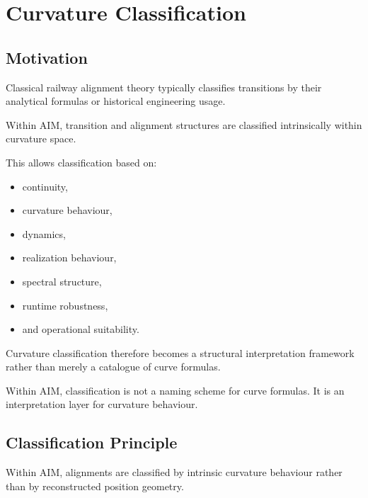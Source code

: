 
\chapter{Curvature Classification}

\label{chap:curvature-classification}

\section*{Motivation}

Classical railway alignment theory typically classifies transitions by
their analytical formulas or historical engineering usage.

Within AIM, transition and alignment structures are classified
intrinsically within curvature space.

This allows classification based on:
\begin{itemize}
\item continuity,
\item curvature behaviour,
\item dynamics,
\item realization behaviour,
\item spectral structure,
\item runtime robustness,
\item and operational suitability.
\end{itemize}

Curvature classification therefore becomes a structural interpretation
framework rather than merely a catalogue of curve formulas.

\begin{principle}
\label{princ:classification-as-interpretation}
Within AIM, classification is not a naming scheme for curve formulas.
It is an interpretation layer for curvature behaviour.
\end{principle}

\section{Classification Principle}

\begin{principle}
\label{princ:intrinsic-classification}
Within AIM, alignments are classified by intrinsic curvature behaviour
rather than by reconstructed position geometry.
\end{principle}

